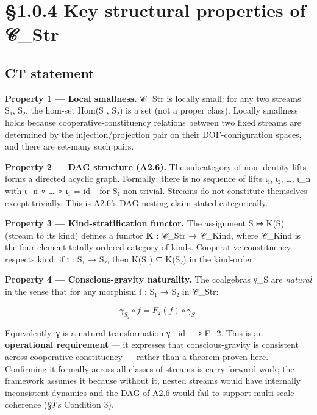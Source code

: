 \documentclass[11pt, openany]{book}
\newcommand{\sectionbreak}{\clearpage}
\begin{document}
\sectionbreak

\section{§1.0.4 Key structural properties of 𝒞\_\allowbreak{}Str}

\subsection{CT statement}

\textbf{Property 1 --- Local smallness.} 𝒞\_\allowbreak{}Str is locally small: for any two streams S₁, S₂, the hom-set Hom(S₁, S₂) is a set (not a proper class). Locally smallness holds because cooperative-constituency relations between two fixed streams are determined by the injection/projection pair on their DOF-configuration spaces, and there are set-many such pairs.

\textbf{Property 2 --- DAG structure (A2.6).} The subcategory of non-identity lifts forms a directed acyclic graph. Formally: there is no sequence of lifts ι₁, ι₂, …, ι\_\allowbreak{}n with ι\_\allowbreak{}n ∘ … ∘ ι₁ = id\_ for S₁ non-trivial. Streams do not constitute themselves except trivially. This is A2.6's DAG-nesting claim stated categorically.

\textbf{Property 3 --- Kind-stratification functor.} The assignment S ↦ K(S) (stream to its kind) defines a functor \textbf{K} : 𝒞\_\allowbreak{}Str → 𝒞\_\allowbreak{}Kind, where 𝒞\_\allowbreak{}Kind is the four-element totally-ordered category of kinds. Cooperative-constituency respects kind: if ι : S₁ → S₂, then K(S₁) ⊆ K(S₂) in the kind-order.

\textbf{Property 4 --- Conscious-gravity naturality.} The coalgebras γ\_\allowbreak{}S are \textit{natural} in the sense that for any morphism f : S₁ → S₂ in 𝒞\_\allowbreak{}Str:

$$\gamma_{S_2} \circ f = F_2(f) \circ \gamma_{S_1}$$

Equivalently, γ is a natural transformation γ : id\_ ⇒ F\_\allowbreak{}2. This is an \textbf{operational requirement} --- it expresses that conscious-gravity is consistent across cooperative-constituency --- rather than a theorem proven here. Confirming it formally across all classes of streams is carry-forward work; the framework assumes it because without it, nested streams would have internally inconsistent dynamics and the DAG of A2.6 would fail to support multi-scale coherence (§9's Condition 3).
\end{document}
